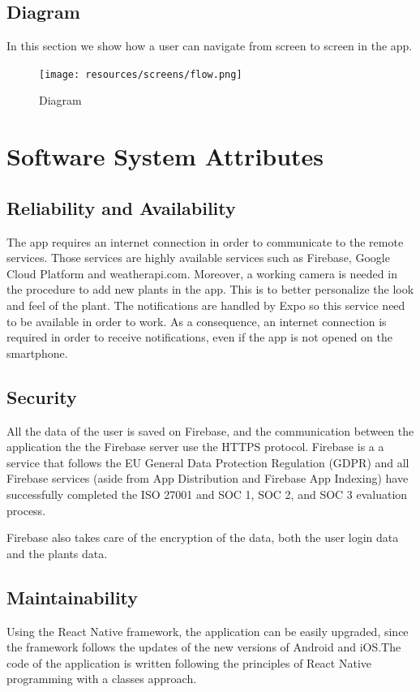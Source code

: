 \documentclass[10pt]{article}
\begin{document}
    \clearpage
    \subsection{Diagram}
    In this section we show how a user can navigate from screen to screen in the app.
    \begin{figure}[h]
     \centering
     \texttt{[image: resources/screens/flow.png]}
    \caption{Diagram}
    \end{figure}
    \clearpage
    
	\section{Software System Attributes}
	\subsection{Reliability and Availability}
	The app requires an internet connection in order to communicate to the remote services. Those services are highly available services such as Firebase, Google Cloud Platform and weatherapi.com. Moreover, a working camera is needed in the procedure to add new plants in the app. This is to better personalize the look and feel of the plant. The notifications are handled by Expo so this service need to be available in order to work. As a consequence, an internet connection is required in order to receive notifications, even if the app is not opened on the smartphone. 
	\subsection{Security}
	All the data of the user is saved on Firebase, and the communication between the application the the Firebase server use the HTTPS protocol. Firebase is a a service that follows the EU General Data Protection Regulation (GDPR) and all Firebase services (aside from App Distribution and Firebase App Indexing) have successfully completed the ISO 27001 and SOC 1, SOC 2, and SOC 3 evaluation process. 
	
	Firebase also takes care of the encryption of the data, both the user login data and the plants data.
	\subsection{Maintainability}
	Using the React Native framework, the application can be easily upgraded, since the framework follows the updates of the new versions of Android and iOS.The code of the application is written following the principles of React Native programming with a classes approach. 
\end{document}
